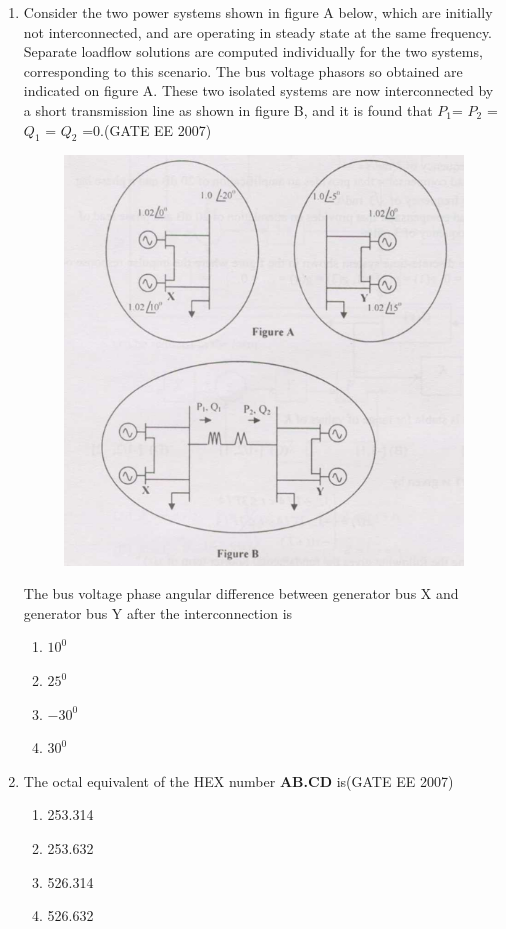 \documentclass[a4paper,10pt]{exam}
\theoremstyle{remark}
\begin{document}
\begin{enumerate}
\vfill
{}
\newpage

\item  \quad
Consider the two power systems shown in figure A below, which are initially not interconnected, and are operating in steady state at the same frequency. Separate loadflow solutions are computed individually for the two systems, corresponding to this scenario. The bus voltage phasors so obtained are indicated on figure A. These two isolated systems are now interconnected by a short transmission line as shown in figure B, and it is found that  $P_{1}$=  $P_{2}$ =  $Q_{1}$ =  $Q_{2}$ =0.\hfill{(GATE EE 2007)} 

\begin{figure}[H]
    \centering
    \includegraphics[width=0.6\linewidth]{figs/Q 32 2007.png} 
    \caption{}
    \label{fig:myfigure}
\end{figure}

The bus voltage phase angular difference between generator bus X and generator bus Y after the interconnection is

\begin{multicols}{4}
\begin{enumerate}
    \item  $10^{0}$
    \item  $25^{0}$
    \item  $-30^{0}$
    \item  $30^{0}$
    \end{enumerate}
\end{multicols}


\item  \quad The octal equivalent of the HEX number \textbf{AB.CD} is\hfill{(GATE EE 2007)} 

\begin{center}
\begin{multicols}{4}
\begin{enumerate}
\item  253.314
\item  253.632
\item  526.314
\item  526.632
\end{enumerate}
\end{multicols}
\end{center}


\end{enumerate}
\end{document}
